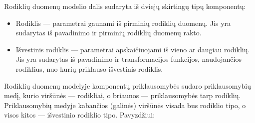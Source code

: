 \documentclass{VUMIFPSbakalaurinis}
\begin{document}
Rodiklių duomenų modelio dalis sudaryta iš dviejų skirtingų tipų komponentų:
\begin{itemize}
    \item Rodiklis — parametrai gaunami iš pirminių rodiklių duomenų. Jis yra sudarytas iš pavadinimo ir pirminių rodiklių duomenų rakto.
    \item Išvestinis rodiklis — parametrai apskaičiuojami iš vieno ar daugiau rodiklių. Jis yra sudarytas iš pavadinimo ir transformacijos funkcijos, naudojančios rodiklius, nuo kurių priklauso išvestinis rodiklis. 
\end{itemize}
Rodiklių duomenų modelyje komponentų priklausomybės sudaro priklausomybių medį, kurio viršūnės — rodikliai, o briaunos — priklausomybės tarp rodiklių. Priklausomybių medyje kabančios (galinės) viršūnės visada bus rodiklio tipo, o visos kitos — išvestinio rodiklio tipo.
Pavyzdžiui:
\end{document}
